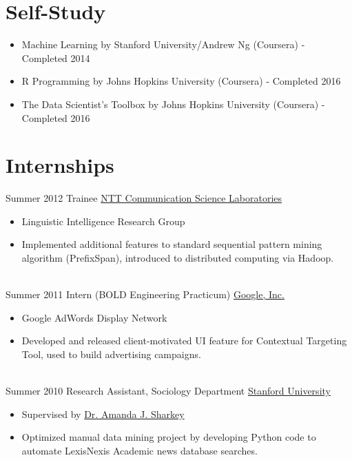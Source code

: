 \documentclass[letterpaper]{twentysecondcv} %
\begin{document}

\section{Self-Study}
\begin{itemize} \itemsep -2pt %
        \item Machine Learning by Stanford University/Andrew Ng (Coursera) - Completed 2014
       	\item R Programming by Johns Hopkins University (Coursera) - Completed 2016
        \item The Data Scientist's Toolbox by Johns Hopkins University (Coursera) - Completed 2016
\end{itemize}


\section{Internships}
\begin{twenty}
	\twentyitem
    	{Summer}
        {2012}
        {Trainee}
        {\href{http://www.kecl.ntt.co.jp/rps/index.html}{NTT Communication Science Laboratories}}
        {}
        {\begin{itemize} \itemsep -2pt %
        \item Linguistic Intelligence Research Group
       	\item Implemented additional features to standard sequential pattern mining algorithm (PrefixSpan), introduced to distributed computing via Hadoop.
        \end{itemize}}
    \\
    \twentyitem
    	{Summer}
        {2011}
        {Intern (BOLD Engineering Practicum)}
        {\href{https://careers.google.com/students/}{Google, Inc.}}
        {}
        {\begin{itemize}  \itemsep -2pt %
        \item Google AdWords Display Network
        \item Developed and released client-motivated UI feature for Contextual Targeting Tool,
            used to build advertising campaigns.
        \end{itemize}}
    \\
    \twentyitem
    	{Summer}
        {2010}
        {Research Assistant, Sociology Department}
        {\href{https://careers.google.com/students/}{Stanford University}}
        {}
        {\begin{itemize}  \itemsep -2pt %
        \item Supervised by \href{https://www.chicagobooth.edu/faculty/directory/s/amanda-j-sharkey}{Dr. Amanda J. Sharkey}
        \item Optimized manual data mining project by developing Python code to automate
            LexisNexis Academic news database searches.
        \end{itemize} }
\end{twenty}
\end{document}
